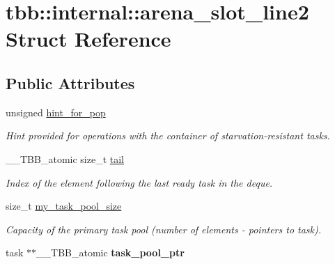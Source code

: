 \hypertarget{structtbb_1_1internal_1_1arena__slot__line2}{}\section{tbb\+:\+:internal\+:\+:arena\+\_\+slot\+\_\+line2 Struct Reference}
\label{structtbb_1_1internal_1_1arena__slot__line2}
\subsection*{Public Attributes}
\begin{DoxyCompactItemize}
\item 
unsigned \hyperlink{structtbb_1_1internal_1_1arena__slot__line2_aa8508e7c5d0b7525f356ac63dbc22427}{hint\+\_\+for\+\_\+pop}
\begin{DoxyCompactList}\small\item\em Hint provided for operations with the container of starvation-\/resistant tasks. \end{DoxyCompactList}\item 
\+\_\+\+\_\+\+T\+B\+B\+\_\+atomic size\+\_\+t \hyperlink{structtbb_1_1internal_1_1arena__slot__line2_af3e2089ebb470604941ca8db193d9927}{tail}
\begin{DoxyCompactList}\small\item\em Index of the element following the last ready task in the deque. \end{DoxyCompactList}\item 
\hypertarget{structtbb_1_1internal_1_1arena__slot__line2_a2c0d5b1c84ce0b83aa6b434dc448b133}{}size\+\_\+t \hyperlink{structtbb_1_1internal_1_1arena__slot__line2_a2c0d5b1c84ce0b83aa6b434dc448b133}{my\+\_\+task\+\_\+pool\+\_\+size}\label{structtbb_1_1internal_1_1arena__slot__line2_a2c0d5b1c84ce0b83aa6b434dc448b133}

\begin{DoxyCompactList}\small\item\em Capacity of the primary task pool (number of elements -\/ pointers to task). \end{DoxyCompactList}\item 
\hypertarget{structtbb_1_1internal_1_1arena__slot__line2_acaf81236f1e1c743b3a1be8b03505a30}{}task $\ast$$\ast$\+\_\+\+\_\+\+T\+B\+B\+\_\+atomic {\bfseries task\+\_\+pool\+\_\+ptr}\label{structtbb_1_1internal_1_1arena__slot__line2_acaf81236f1e1c743b3a1be8b03505a30}

\end{DoxyCompactItemize}


